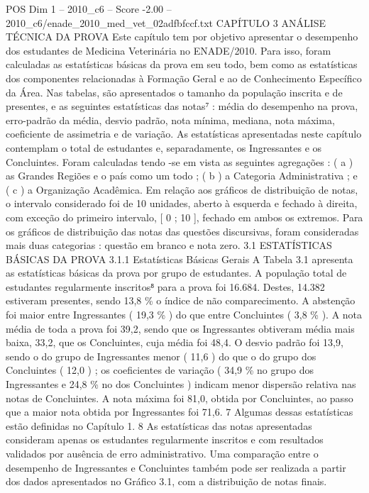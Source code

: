 \begin{textsample}{POS Dim 1 – 2010\_c6 – Score -2.00 – 2010\_c6/enade\_2010\_med\_vet\_02adfbfccf.txt}  \label{ex:f1_pos_167}
CAPÍTULO 3 ANÁLISE TÉCNICA DA PROVA Este capítulo tem por objetivo apresentar o desempenho dos estudantes de Medicina Veterinária no ENADE/2010.
Para isso, foram calculadas as estatísticas básicas da prova em seu todo, bem como as estatísticas dos componentes relacionadas à Formação Geral e ao de Conhecimento Específico da Área.
Nas tabelas, são apresentados o tamanho da população inscrita e de presentes, e as seguintes estatísticas das notas⁷ : média do desempenho na prova, erro-padrão da média, desvio padrão, nota mínima, mediana, nota máxima, coeficiente de assimetria e de variação.
As estatísticas apresentadas neste capítulo contemplam o total de estudantes e, separadamente, os Ingressantes e os Concluintes.
Foram calculadas tendo -se em vista as seguintes agregações : ( a ) as Grandes Regiões e o país como um todo ; ( b ) a Categoria Administrativa ; e ( c ) a Organização Acadêmica.
Em relação aos gráficos de distribuição de notas, o intervalo considerado foi de 10 unidades, aberto à esquerda e fechado à direita, com exceção do primeiro intervalo, [ 0 ; 10 ], fechado em ambos os extremos.
Para os gráficos de distribuição das notas das questões discursivas, foram consideradas mais duas categorias : questão em branco e nota zero. 3.1 ESTATÍSTICAS BÁSICAS DA PROVA 3.1.1 Estatísticas Básicas Gerais A Tabela 3.1 apresenta as estatísticas básicas da prova por grupo de estudantes.
A população total de estudantes regularmente inscritos⁸ para a prova foi 16.684.
Destes, 14.382 estiveram presentes, sendo 13,8 \% o índice de não comparecimento.
A abstenção foi maior entre Ingressantes ( 19,3 \% ) do que entre Concluintes ( 3,8 \% ).
A nota média de toda a prova foi 39,2, sendo que os Ingressantes obtiveram média mais baixa, 33,2, que os Concluintes, cuja média foi 48,4.
O desvio padrão foi 13,9, sendo o do grupo de Ingressantes menor ( 11,6 ) do que o do grupo dos Concluintes ( 12,0 ) ; os coeficientes de variação ( 34,9 \% no grupo dos Ingressantes e 24,8 \% no dos Concluintes ) indicam menor dispersão relativa nas notas de Concluintes.
A nota máxima foi 81,0, obtida por Concluintes, ao passo que a maior nota obtida por Ingressantes foi 71,6. 7 Algumas dessas estatísticas estão definidas no Capítulo 1. 8 As estatísticas das notas apresentadas consideram apenas os estudantes regularmente inscritos e com resultados validados por ausência de erro administrativo.
Uma comparação entre o desempenho de Ingressantes e Concluintes também pode ser realizada a partir dos dados apresentados no Gráfico 3.1, com a distribuição de notas finais.

\end{textsample}
